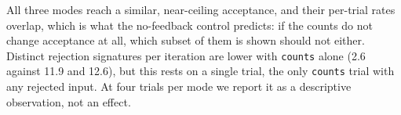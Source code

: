 All three modes reach a similar, near-ceiling acceptance, and their per-trial
rates overlap, which is what the no-feedback control predicts: if the counts
do not change acceptance at all, which subset of them is shown should not
either. Distinct rejection signatures per iteration are lower with
\texttt{counts} alone (2.6 against 11.9 and 12.6), but this rests on a single
trial, the only \texttt{counts} trial with any rejected input. At four
trials per mode we report it as a descriptive observation, not an effect.

